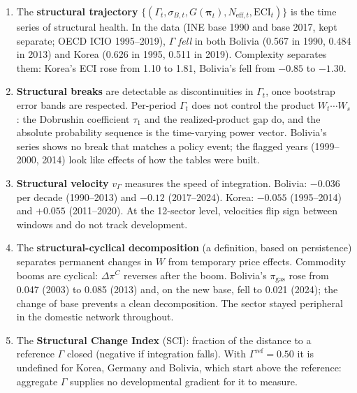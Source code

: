 \documentclass[../structural_economics_book.tex]{subfiles}
\begin{document}
\begin{enumerate}
\item The \textbf{structural trajectory} $\{(\Gamma_t, \sigma_{B,t}, G(\boldsymbol{\pi}_t), N_{\text{eff},t}, \text{ECI}_t)\}$ is the time series of structural health. In the data (INE base 1990 and base 2017, kept separate; OECD ICIO 1995--2019), $\Gamma$ \emph{fell} in both Bolivia (0.567 in 1990, 0.484 in 2013) and Korea (0.626 in 1995, 0.511 in 2019). Complexity separates them: Korea's ECI rose from 1.10 to 1.81, Bolivia's fell from $-0.85$ to $-1.30$.

\item \textbf{Structural breaks} are detectable as discontinuities in $\Gamma_t$, once bootstrap error bands are respected. Per-period $\Gamma_t$ does not control the product $W_t\cdots W_s$: the Dobrushin coefficient $\tau_1$ and the realized-product gap do, and the absolute probability sequence is the time-varying power vector. Bolivia's series shows no break that matches a policy event; the flagged years (1999--2000, 2014) look like effects of how the tables were built.

\item \textbf{Structural velocity} $v_\Gamma$ measures the speed of integration. Bolivia: $-0.036$ per decade (1990--2013) and $-0.12$ (2017--2024). Korea: $-0.055$ (1995--2014) and $+0.055$ (2011--2020). At the 12-sector level, velocities flip sign between windows and do not track development.

\item The \textbf{structural-cyclical decomposition} (a definition, based on persistence) separates permanent changes in $W$ from temporary price effects. Commodity booms are cyclical: $\Delta\pi^C$ reverses after the boom. Bolivia's $\pi_{\text{gas}}$ rose from 0.047 (2003) to 0.085 (2013) and, on the new base, fell to 0.021 (2024); the change of base prevents a clean decomposition. The sector stayed peripheral in the domestic network throughout.

\item The \textbf{Structural Change Index} (SCI): fraction of the distance to a reference $\Gamma$ closed (negative if integration falls). With $\Gamma^{\text{ref}} = 0.50$ it is undefined for Korea, Germany and Bolivia, which start above the reference: aggregate $\Gamma$ supplies no developmental gradient for it to measure.
\end{enumerate}


\end{document}
